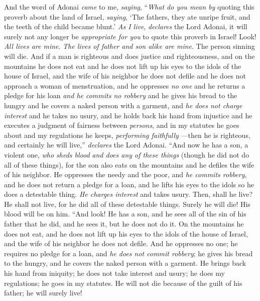 \begin{biblechapter} %
 And the word of Adonai \textit{came} to me, \textit{saying},
\verse “\textit{What do you mean by} quoting this proverb about the land of Israel, \textit{saying}, ‘The fathers, they ate unripe fruit, and the teeth of the child became blunt.’
\verse \textit{As I live}, \textit{declares} the Lord Adonai, it will surely not any longer be \textit{appropriate for you} to quote this proverb in Israel!
\verse Look! \textit{All lives are mine}. \textit{The lives of father and son alike are mine}. The person sinning will die.
\verse And if a man is righteous and does justice and righteousness,
\verse and on the mountains he does not eat and he does not lift up his eyes to the idols of the house of Israel, and the wife of his neighbor he does not defile and he does not approach a woman of menstruation,
\verse and he oppresses \textit{no one} and he returns a pledge for his loan \textit{and he commits no robbery} and he gives his bread to the hungry and he covers a naked person with a garment,
\verse and \textit{he does not charge interest} and he takes no usury, and he holds back his hand from injustice and he executes a judgment of fairness between \textit{persons},
\verse and in my statutes he goes about and my regulations he keeps, \textit{performing faithfully} —then he is righteous, and certainly he will live,” \textit{declares} the Lord Adonai.
\verse “And now he has a son, a violent one, \textit{who sheds blood} \textit{and does any of these things}
\verse (though he did not do all of these things), for the son also eats on the mountains and he defiles the wife of his neighbor.
\verse He oppresses the needy and the poor, and \textit{he commits robbery}, and he does not return a pledge for a loan, and he lifts his eyes to the idols so he does a detestable thing.
\verse \textit{He charges interest} and takes usury. Then, shall he live? He shall not live, for he did all of these detestable things. Surely he will die! His blood will be on him.
\verse “And look! He has a son, and he sees all of the sin of his father that he did, and he sees it, but he does not do it.
\verse On the mountains he does not eat, and he does not lift up his eyes to the idols of the house of Israel, and the wife of his neighbor he does not defile.
\verse And he oppresses no one; he requires no pledge for a loan, and \textit{he does not commit robbery}; he gives his bread to the hungry, and he covers the naked person with a garment.
\verse He brings back his hand from iniquity; he does not take interest and usury; he does my regulations; he goes in my statutes. He will not die because of the guilt of his father; he will surely live!

\end{biblechapter}
